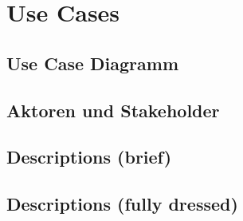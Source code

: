 \section{Use Cases}
\subsection*{Use Case Diagramm}
\subsection*{Aktoren und Stakeholder}
\subsection*{Descriptions (brief)}
\subsection*{Descriptions (fully dressed)}